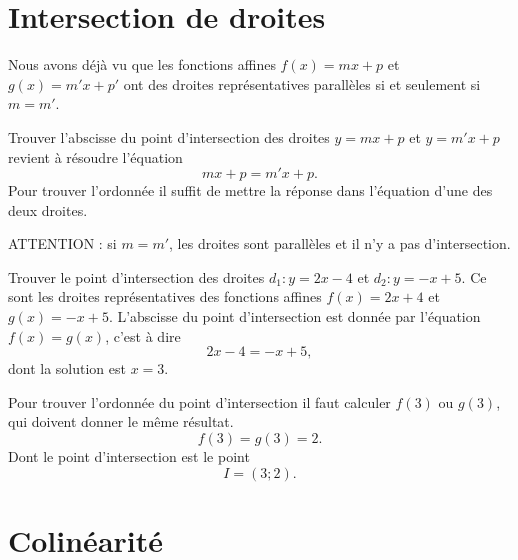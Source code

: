 \section{Intersection de droites}

Nous avons déjà vu que les fonctions affines \( f(x)=mx+p\) et \( g(x)=m'x+p'\) ont des droites représentatives parallèles si et seulement si \( m=m'\).

\begin{Aretenir}
    Trouver l'abscisse du point d'intersection des droites \( y=mx+p\) et \( y=m'x+p\) revient à résoudre l'équation
    \begin{equation}
        mx+p=m'x+p.
    \end{equation}
    Pour trouver l'ordonnée il suffit de mettre la réponse dans l'équation d'une des deux droites.

    ATTENTION : si \( m=m'\), les droites sont parallèles et il n'y a pas d'intersection.
\end{Aretenir}

\begin{example}
    Trouver le point d'intersection des droites \( d_1:y=2x-4\) et \( d_2:y=-x+5\). Ce sont les droites représentatives des fonctions affines \( f(x)=2x+4\) et \( g(x)=-x+5\). L'abscisse du point d'intersection est donnée par l'équation \( f(x)=g(x)\), c'est à dire
    \begin{equation}
        2x-4=-x+5,
    \end{equation}
    dont la solution est \( x=3\). 

    Pour trouver l'ordonnée du point d'intersection il faut calculer \( f(3)\) ou \( g(3)\), qui doivent donner le même résultat.
    \begin{equation}
        f(3)=g(3)=2.
    \end{equation}
    Dont le point d'intersection est le point
    \begin{equation}
        I=(3;2).
    \end{equation}
\end{example}

\section{Colinéarité}

